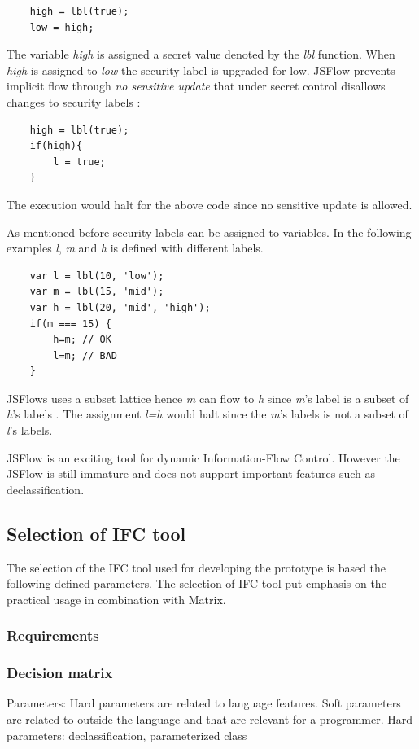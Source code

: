 \begin{lstlisting}
	high = lbl(true);
	low = high;
\end{lstlisting}
 
The variable \emph{high} is assigned a secret value denoted by the \emph{lbl} function. When \emph{high} is assigned to \emph{low} the security label is upgraded for low. JSFlow prevents implicit flow through \emph{no sensitive update} that under secret control disallows changes to security labels \cite{Hedin2014}:

\begin{lstlisting}
	high = lbl(true);
	if(high){
		l = true;
	}
\end{lstlisting}

The execution would halt for the above code since no sensitive update is allowed. 

As mentioned before security labels can be assigned to variables. In the following examples \emph{l}, \emph{m} and \emph{h} is defined with different labels.

\begin{lstlisting}
	var l = lbl(10, 'low');
	var m = lbl(15, 'mid');
	var h = lbl(20, 'mid', 'high');
	if(m === 15) {
		h=m; // OK
		l=m; // BAD
	}
\end{lstlisting}

JSFlows uses a subset lattice hence \emph{m} can flow to \emph{h} since \emph{m}'s label is a subset of \emph{h}'s labels \cite{jsflowsite}. The assignment \emph{l=h} would halt since the \emph{m}'s labels is not a subset of \emph{l}'s labels.


JSFlow is an exciting tool for dynamic Information-Flow Control. However the JSFlow is still immature and does not support important features such as declassification.

\subsection{Selection of IFC tool}
The selection of the IFC tool used for developing the prototype is based the following defined parameters.
The selection of IFC tool put emphasis on the practical usage in combination with Matrix. 

\subsubsection{Requirements}

\subsubsection{Decision matrix}
Parameters: Hard parameters are related to language features. Soft parameters are related to outside the language and that are relevant for a programmer.
Hard parameters: declassification, parameterized class

